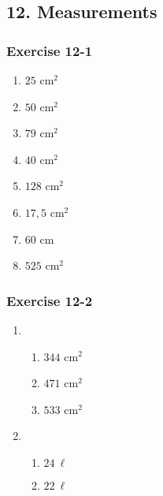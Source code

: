 {\begin{multicols}{3}
\begin{enumerate}[noitemsep, label=\textbf{\arabic*}.]
\end{enumerate}
\end{multicols}

\subsection*{12. Measurements}
\begin{multicols}{3}
\subsubsection*{Exercise 12-1} %
\begin{enumerate}[noitemsep, label=\textbf{\arabic*}. ] 
\item $25$ cm$^2$
\item $50$ cm$^2$
\item $79$ cm$^2$
\item $40$ cm$^2$
\item $128$ cm$^2$
\item $17,5$ cm$^2$
\item $60$ cm
\item $525$ cm$^2$
\end{enumerate}


\subsubsection*{Exercise 12-2} %
\begin{enumerate}[noitemsep, label=\textbf{\arabic*}. ] 
\item %
    \begin{enumerate}[noitemsep, label=\textbf{(\alph*)} ]
	  \item $344$ cm$^2$
	  \item  $471$ cm$^2$
	  \item  $533$ cm$^2$
    \end{enumerate}


\item %
    \begin{enumerate}[noitemsep, label=\textbf{(\alph*)} ]
	  \item $24~\ell$ %
	  \item $22~\ell$%
    \end{enumerate}
\end{enumerate}       



\end{multicols}}
